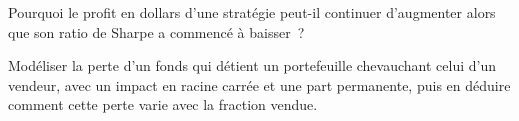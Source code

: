 \begin{interviewq}\label{iq:rs:capacity-decay-and-crowding:5}
Pourquoi le profit en dollars d'une stratégie peut-il continuer d'augmenter alors que son ratio de Sharpe a commencé à baisser~?
\end{interviewq}

\begin{interviewq}\label{iq:rs:capacity-decay-and-crowding:6}
Modéliser la perte d'un fonds qui détient un portefeuille chevauchant celui d'un vendeur, avec un impact en racine carrée et une part permanente, puis en déduire comment cette perte varie avec la fraction vendue.
\end{interviewq}
